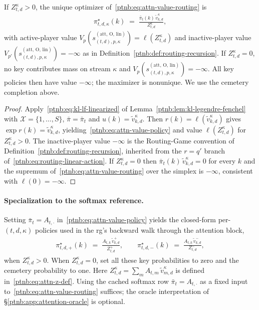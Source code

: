 \begin{proposition}\label{ptnb:prop:attn-value-policy}
If $Z_{t,d}^\kappa > 0$, the unique optimizer of~\eqref{ptnb:eq:attn-value-routing} is
\begin{align}\label{ptnb:eq:attn-value-policy}
    \pi_{t,d,\kappa}^\star(k)
    \;=\;
    \frac{\bar\pi_t(k)\, \tilde{v}_{k,d}^\kappa}{Z_{t,d}^\kappa},
\end{align}
with active-player value $V_p(s_{(t,d),p,\kappa}^{(\mathrm{att},\,\mathrm{O},\,\mathrm{lin})}) =
    \ell(Z_{t,d}^\kappa)$ and inactive-player value
$V_{p'}(s_{(t,d),p,\kappa}^{(\mathrm{att},\,\mathrm{O},\,\mathrm{lin})}) = -\infty$ as in
Definition~\ref{ptnb:def:routing-recursion}. If $Z_{t,d}^\kappa = 0$, no key contributes mass on stream
$\kappa$ and $V_p(s_{(t,d),p,\kappa}^{(\mathrm{att},\,\mathrm{O},\,\mathrm{lin})}) = -\infty$. All key policies then have value $-\infty$;
the maximizer is nonunique. We use the cemetery completion above.\end{proposition}

\begin{proof}
Apply~\eqref{ptnb:eq:kl-lf-linearized} of Lemma~\ref{ptnb:lem:kl-legendre-fenchel}
with $\mathcal{X} = \{1,\dots,S\}$, $\bar\pi = \bar\pi_t$ and $u(k) = \tilde{v}_{k,d}^\kappa$.
Then $r(k) = \ell(\tilde{v}_{k,d}^\kappa)$ gives $\exp r(k) = \tilde{v}_{k,d}^\kappa$,
yielding~\eqref{ptnb:eq:attn-value-policy} and value $\ell(Z_{t,d}^\kappa)$ for $Z_{t,d}^\kappa > 0$. The
inactive-player value $-\infty$ is the Routing-Game convention of
Definition~\ref{ptnb:def:routing-recursion}, inherited from the $r = q'$ branch
of~\eqref{ptnb:eq:routing-linear-action}. If $Z_{t,d}^\kappa = 0$ then
$\bar\pi_t(k)\,\tilde{v}_{k,d}^\kappa = 0$ for every $k$ and the supremum
of~\eqref{ptnb:eq:attn-value-routing} over the simplex is $-\infty$, consistent with $\ell(0) =
    -\infty$.
\end{proof}

\paragraph{Specialization to the softmax reference.}
Setting $\bar\pi_t = A_{t,\cdot}$ in~\eqref{ptnb:eq:attn-value-policy} yields the closed-form
per-$(t,d,\kappa)$ policies used in the \ac{rg}'s backward walk through the attention block,
\begin{align}\label{ptnb:eq:attn-branch-policy}
    \pi_{t,d,+}^\star(k) \;=\; \frac{A_{t,k}\, \tilde{v}_{k,d}^+}{Z_{t,d}^+},
    \qquad
    \pi_{t,d,-}^\star(k) \;=\; \frac{A_{t,k}\, \tilde{v}_{k,d}^-}{Z_{t,d}^-},
\end{align}
when $Z_{t,d}^\kappa>0$. When $Z_{t,d}^\kappa=0$, set all these key probabilities to zero
and the cemetery probability to one. Here $Z_{t,d}^\kappa = \sum_m A_{t,m}\, \tilde{v}_{m,d}^\kappa$
is defined in~\eqref{ptnb:eq:attn-z-def}. Using the cached softmax row $\bar\pi_t = A_{t,\cdot}$ as a fixed input
to~\eqref{ptnb:eq:attn-value-routing} suffices; the oracle interpretation of
\S\ref{ptnb:app:attention-oracle} is optional.

